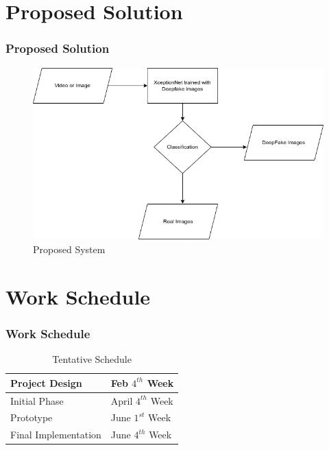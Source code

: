 \documentclass{beamer}
\begin{document}
\section{Proposed Solution}
\begin{frame}
	\frametitle{Proposed Solution}
	\begin{figure}
		\centering
		\includegraphics[scale=0.5]{./images/proposed.png}
		\caption{Proposed System}
	\end{figure}
\end{frame}


\section{Work Schedule}
\begin{frame}
	\frametitle{Work Schedule}
	\begin{table}
		\centering
		\def\arraystretch{1.5}%
		\begin{tabular}[!h]{|p{6cm}|p{4cm}|}
			\hline
			Project Design & Feb $4^{th}$ Week \\
			\hline
			Initial Phase & April $4^{th}$ Week \\
			\hline
			Prototype & June $1^{st}$ Week \\
			\hline
			Final Implementation & June $4^{th}$ Week \\
			\hline
		\end{tabular}
	\caption{Tentative Schedule}
	\label{schedule}
	\end{table}
\end{frame}

\end{document}
